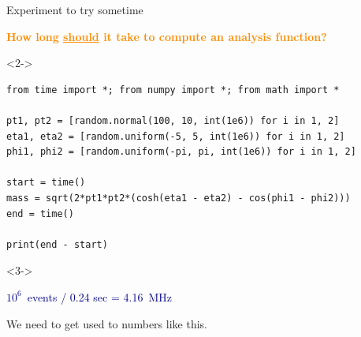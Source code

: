 \documentclass[aspectratio=169]{beamer}
\begin{document}
\begin{frame}[fragile]{Experiment to try sometime}
\vspace{0.25 cm}
\begin{center}
\textcolor{darkorange}{\bf How long \underline{should} it take to compute an analysis function?}
\end{center}

\small
\begin{uncoverenv}<2->
\begin{verbatim}
from time import *; from numpy import *; from math import *

pt1, pt2 = [random.normal(100, 10, int(1e6)) for i in 1, 2]
eta1, eta2 = [random.uniform(-5, 5, int(1e6)) for i in 1, 2]
phi1, phi2 = [random.uniform(-pi, pi, int(1e6)) for i in 1, 2]

start = time()
mass = sqrt(2*pt1*pt2*(cosh(eta1 - eta2) - cos(phi1 - phi2)))
end = time()

print(end - start)
\end{verbatim}
\end{uncoverenv}

\normalsize
\vspace{-0.75 cm}\hfill\begin{minipage}{0.35\linewidth}
\begin{uncoverenv}<3->
\begin{center}
\textcolor{darkblue}{$10^6$~events / 0.24 sec = 4.16~MHz}

\vspace{0.25 cm}
We need to get used to numbers like this.
\end{center}
\end{uncoverenv}
\vspace{0.75 cm}
\end{minipage}\hspace{0.5 cm}
\end{frame}
\end{document}
